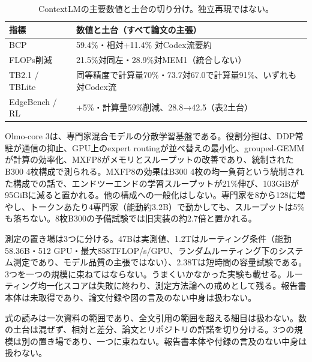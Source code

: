\begin{table}[h]
\centering\footnotesize
\begin{tabularx}{0.98\linewidth}{@{}lX@{}}
\toprule
指標 & 数値と土台（すべて論文の主張） \\
\midrule
BCP & 59.4\%・相対+11.4\% 対Codex流要約 \\
FLOPs削減 & 21.5\%対同左・28.9\%対MEM1（統合しない） \\
TB2.1 / TBLite & 同等精度で計算量70\%・73.7対67.0で計算量91\%、いずれも対Codex流 \\
EdgeBench / RL & +5\%・計算量59\%削減、28.8→42.5（表2土台） \\
\bottomrule
\end{tabularx}
\caption{ContextLMの主要数値と土台の切り分け。独立再現ではない。}
\end{table}

Olmo-core 3は、専門家混合モデルの分散学習基盤である\cite{olmocore3}。役割分担は、DDP常駐が通信の抑止、GPU上のexpert routingが並べ替えの最小化、grouped-GEMMが計算の効率化、MXFP8がメモリとスループットの改善であり、統制されたB300 4枚構成で測られる。MXFP8の効果はB300 4枚の均一負荷という統制された構成での話で、エンドツーエンドの学習スループットが21\%伸び、103GiBが95GiBに減ると置かれる。他の構成への一般化はしない。専門家を8から128に増やし、トークンあたり4専門家（能動約3.2B）で動かしても、スループットは5\%も落ちない。8枚B300の予備試験では旧実装の約2.7倍と置かれる。

測定の置き場は3つに分ける。47Bは実測値、1.2Tはルーティング条件（能動58.36B・512 GPU・最大858TFLOP/s/GPU、ランダムルーティング下のシステム測定であり、モデル品質の主張ではない）、2.38Tは短時間の容量試験である。3つを一つの規模に束ねてはならない。うまくいかなかった実験も載せる。ルーティング均一化スコアは失敗に終わり、測定方法論への戒めとして残る。報告書本体は未取得であり、論文付録や図の言及のない中身は扱わない。

\begin{claimboundary}[資料と評価の境界]
式の読みは一次資料の範囲であり、全文引用の範囲を超える細目は扱わない。数の土台は混ぜず、相対と差分、論文とリポジトリの許諾を切り分ける。3つの規模は別の置き場であり、一つに束ねない。報告書本体や付録の言及のない中身は扱わない。
\end{claimboundary}
